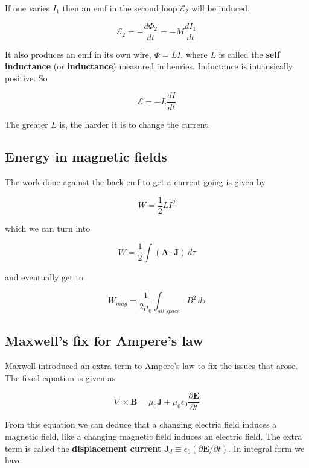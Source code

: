 \documentclass[a4paper]{article}
\begin{document}
If one varies $I_1$ then an emf in the second loop $\mathcal{E}_2$ will be induced.

\begin{equation}
    \mathcal{E}_2=-\frac{d\Phi_2}{dt}=-M\frac{dI_1}{dt}
\end{equation}

It also produces an emf in its own wire, $\Phi=LI$, where $L$ is called the \textbf{self inductance} (or \textbf{inductance}) measured in henries. Inductance is intrinsically positive. So

\begin{equation}
    \mathcal{E}=-L\frac{dI}{dt}
\end{equation}

The greater $L$ is, the harder it is to change the current.

\subsection{Energy in magnetic fields}

The work done against the back emf to get a current going is given by

\begin{equation}
    W=\frac{1}{2}LI^2
\end{equation}

which we can turn into

\begin{equation}
    W=\frac{1}{2}\int (\bm{A}\cdot\bm{J})\,d\tau
\end{equation}

and eventually get to

\begin{equation}
    W_{mag}=\frac{1}{2\mu_0}\int_{all\ space}B^2\,d\tau
\end{equation}

\subsection{Maxwell's fix for Ampere's law}

Maxwell introduced an extra term to Ampere's law to fix the issues that arose. The fixed equation is given as

\begin{equation}
    \nabla\times\bm{B}=\mu_0\bm{J}+\mu_0\epsilon_0\frac{\partial\bm{E}}{\partial t}
\end{equation}

From this equation we can deduce that a changing electric field induces a magnetic field, like a changing magnetic field induces an electric field. The extra term is called the \textbf{displacement current} $\bm{J}_d\equiv \epsilon_0(\partial\bm{E}/\partial t)$. In integral form we have
\end{document}
